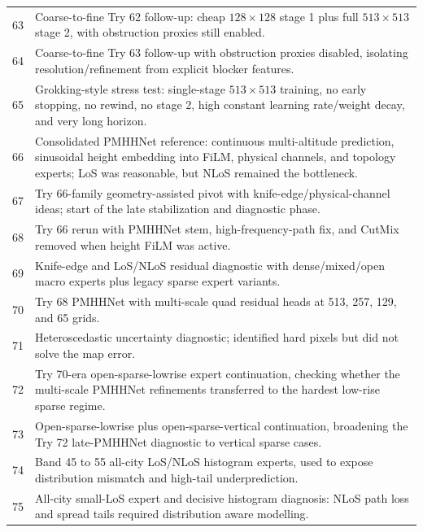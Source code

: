 \begin{table}[H]
\begin{tabularx}{\textwidth}{p{}>{\raggedright\arraybackslash}X}
63 & Coarse-to-fine Try 62 follow-up: cheap \(128\times128\) stage 1 plus full \(513\times513\) stage 2, with obstruction proxies still enabled. \\
64 & Coarse-to-fine Try 63 follow-up with obstruction proxies disabled, isolating resolution/refinement from explicit blocker features. \\
65 & Grokking-style stress test: single-stage \(513\times513\) training, no early stopping, no rewind, no stage 2, high constant learning rate/weight decay, and very long horizon. \\
66 & Consolidated PMHHNet reference: continuous multi-altitude prediction, sinusoidal height embedding into FiLM, physical channels, and topology experts; LoS was reasonable, but NLoS remained the bottleneck. \\
67 & Try 66-family geometry-assisted pivot with knife-edge/physical-channel ideas; start of the late stabilization and diagnostic phase. \\
68 & Try 66 rerun with PMHHNet stem, high-frequency-path fix, and CutMix removed when height FiLM was active. \\
69 & Knife-edge and LoS/NLoS residual diagnostic with dense/mixed/open macro experts plus legacy sparse expert variants. \\
70 & Try 68 PMHHNet with multi-scale quad residual heads at 513, 257, 129, and 65 grids. \\
71 & Heteroscedastic uncertainty diagnostic; identified hard pixels but did not solve the map error. \\
72 & Try 70-era open-sparse-lowrise expert continuation, checking whether the multi-scale PMHHNet refinements transferred to the hardest low-rise sparse regime. \\
73 & Open-sparse-lowrise plus open-sparse-vertical continuation, broadening the Try 72 late-PMHHNet diagnostic to vertical sparse cases. \\
74 & Band 45 to 55 all-city LoS/NLoS histogram experts, used to expose distribution mismatch and high-tail underprediction. \\
75 & All-city small-LoS expert and decisive histogram diagnosis: NLoS path loss and spread tails required distribution aware modelling. \\
\bottomrule
\end{tabularx}
\end{table}
\small

